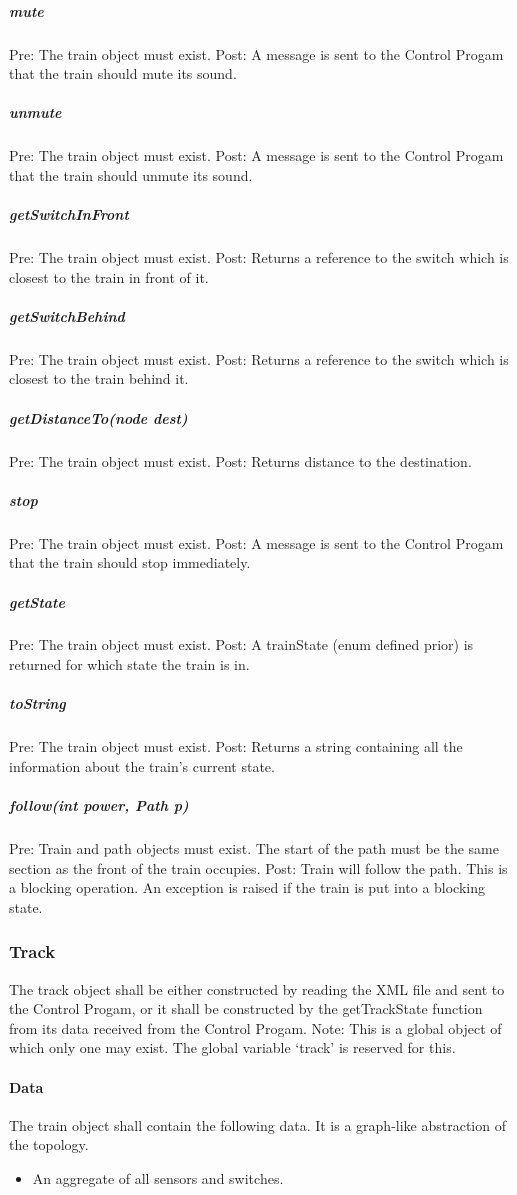 \documentclass[a4paper,11pt,notitlepage]{article}
\def\CS{Control Progam\xspace} \def\LC{Local Copy of Train State\xspace} \def\TN{Track Node\xspace}
\begin{document}
\subparagraph{mute} Pre: The train object must exist. Post: A message is sent to the \CS that the train should mute its sound.
\subparagraph{unmute} Pre: The train object must exist. Post: A message is sent to the \CS that the train should unmute its sound.
\subparagraph{getSwitchInFront} Pre: The train object must exist. Post: Returns a reference to the switch which is closest to the train in front of it.
\subparagraph{getSwitchBehind} Pre: The train object must exist. Post: Returns a reference to the switch which is closest to the train behind it.
\subparagraph{getDistanceTo(node dest)} Pre: The train object must exist. Post: Returns distance to the destination.
\subparagraph{stop} Pre: The train object must exist. Post: A message is sent to the \CS that the train should stop immediately.
\subparagraph{getState} Pre: The train object must exist. Post: A trainState (enum defined prior) is returned for which state the train is in.
\subparagraph{toString} Pre: The train object must exist. Post: Returns a string containing all the information about the train's current state.
\subparagraph{follow(int power, Path p)} Pre: Train and path objects must exist. The start of the path must be the same section as the front of the train occupies. Post: Train will follow the path. This is a blocking operation. An exception is raised if the train is put into a blocking state.

\subsubsection{Track}
The track object shall be either constructed by reading the XML file and sent to the \CS, or it shall be constructed by the getTrackState function from its data received from the \CS.
Note: This is a global object of which only one may exist. The global variable `track' is reserved for this.
\paragraph{Data}
The train object shall contain the following data. It is a graph-like abstraction of the topology.
\begin{itemize}
\item An aggregate of all sensors and switches.
\end{itemize}
\end{document}
